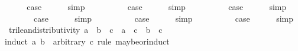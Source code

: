 \begin{isabellebody}
\ \ \isamarkupfalse%
\ \isamarkupfalse%
\ {\isacharquery}case\isanewline
\ \ \ \ \isamarkupfalse%
\ simp\isanewline
{}\isamarkupfalse%
\isanewline
\ \ \isamarkupfalse%
\ {\isachardoublequoteopen}{}{\isacharunderscore}{}{\isachardoublequoteclose}\isanewline
\ \ \isamarkupfalse%
\ \isamarkupfalse%
\ {\isacharquery}case\isanewline
\ \ \ \ \isamarkupfalse%
\ simp\isanewline
{}\isamarkupfalse%
\isanewline
\ \ \isamarkupfalse%
\ {\isachardoublequoteopen}{}{\isacharunderscore}{}{\isachardoublequoteclose}\isanewline
\ \ \isamarkupfalse%
\ \isamarkupfalse%
\ {\isacharquery}case\isanewline
\ \ \ \ \isamarkupfalse%
\ simp\isanewline
{}\isamarkupfalse%
\isanewline
\ \ \isamarkupfalse%
\ {\isachardoublequoteopen}{}{\isacharunderscore}{}{\isachardoublequoteclose}\isanewline
\ \ \isamarkupfalse%
\ \isamarkupfalse%
\ {\isacharquery}case\isanewline
\ \ \ \ \isamarkupfalse%
\ simp\isanewline
{}\isamarkupfalse%
\isanewline
\ \ \isamarkupfalse%
\ {}\isanewline
\ \ \isamarkupfalse%
\ \isamarkupfalse%
\ {\isacharquery}case\isanewline
\ \ \ \ \isamarkupfalse%
\ simp\isanewline
{}\isamarkupfalse%
\isanewline
\ \ \isamarkupfalse%
\ {}\isanewline
\ \ \isamarkupfalse%
\ \isamarkupfalse%
\ {\isacharquery}case\isanewline
\ \ \ \ \isamarkupfalse%
\ simp\isanewline
{}\isamarkupfalse%
%
\endisatagproof
{\isafoldproof}%
%
\isadelimproof
\isanewline
%
\endisadelimproof
\isanewline
{}\isamarkupfalse%
\ trilean{\isacharunderscore}distributivity{\isacharcolon}\ {\isachardoublequoteopen}a\ {\isasymor}\isactrlsub {\isacharquery}\ b\ {\isasymand}\isactrlsub {\isacharquery}\ c\ {\isacharequal}\ a\ {\isasymand}\isactrlsub {\isacharquery}\ c\ {\isasymor}\isactrlsub {\isacharquery}\ {\isacharparenleft}b\ {\isasymand}\isactrlsub {\isacharquery}\ c{\isacharparenright}{\isachardoublequoteclose}\isanewline
%
\isadelimproof
%
\endisadelimproof
%
\isatagproof
{}\isamarkupfalse%
{\isacharparenleft}induct\ a\ b\ \ arbitrary{\isacharcolon}\ c\ rule{\isacharcolon}\ maybe{\isacharunderscore}or{\isachardot}induct{\isacharparenright}\isanewline

\end{isabellebody}

